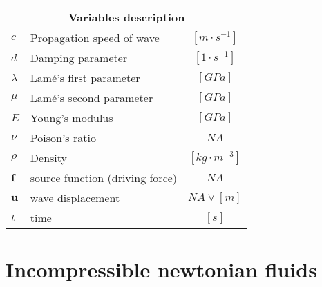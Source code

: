 \documentclass[a4paper,10pt]{book}
\begin{document}
\begin{tabular}{|l|l|c|}
    \hline
    \multicolumn{3}{|c|}{Variables description} \\
    \hline
    $c$ & Propagation speed of wave & $[m\cdot{s^{-1}}]$ \\
    $d$ & Damping parameter & $[1\cdot{s^{-1}}]$ \\
    $\lambda$ & Lam\'{e}'s first parameter & $[GPa]$ \\
    $\mu$ & Lam\'{e}'s second parameter & $[GPa]$ \\
    $E$ & Young's modulus & $[GPa]$ \\
    $\nu$ & Poison's ratio & $NA$ \\
    $\rho$ & Density & $[kg\cdot{m^{-3}}]$ \\
    $\mathbf f$ & source function (driving force) & $NA$ \\
    $\mathbf u$ & wave displacement & $NA \vee [m]$ \\
    $t$ & time & $[s]$ \\
    \hline
\end{tabular}

\section{Incompressible newtonian fluids}
\end{document}
